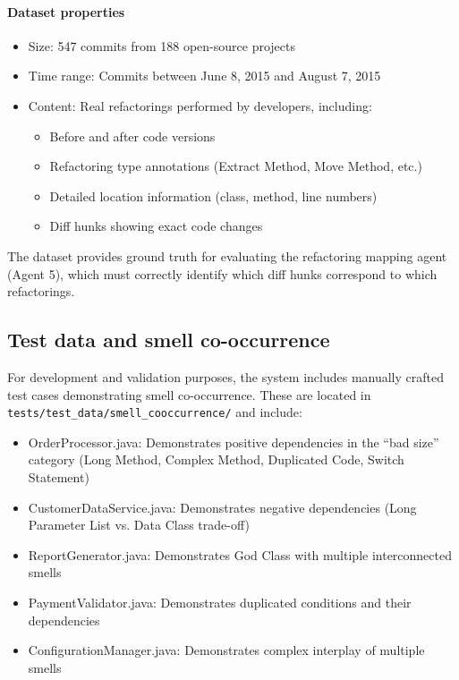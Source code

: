 \paragraph{Dataset properties}
\begin{itemize}
    \item Size: 547 commits from 188 open-source projects
    \item Time range: Commits between June 8, 2015 and August 7, 2015
    \item Content: Real refactorings performed by developers, including:
    \begin{itemize}
        \item Before and after code versions
        \item Refactoring type annotations (Extract Method, Move Method, etc.)
        \item Detailed location information (class, method, line numbers)
        \item Diff hunks showing exact code changes
    \end{itemize}
\end{itemize}

The dataset provides ground truth for evaluating the refactoring mapping agent (Agent 5), which must correctly identify which diff hunks correspond to which refactorings.

\subsection{Test data and smell co-occurrence}

For development and validation purposes, the system includes manually crafted test cases demonstrating smell co-occurrence. These are located in \texttt{tests/test\_data/smell\_cooccurrence/} and include:

\begin{itemize}
    \item OrderProcessor.java: Demonstrates positive dependencies in the ``bad size'' category (Long Method, Complex Method, Duplicated Code, Switch Statement)
    \item CustomerDataService.java: Demonstrates negative dependencies (Long Parameter List vs. Data Class trade-off)
    \item ReportGenerator.java: Demonstrates God Class with multiple interconnected smells
    \item PaymentValidator.java: Demonstrates duplicated conditions and their dependencies
    \item ConfigurationManager.java: Demonstrates complex interplay of multiple smells
\end{itemize}

